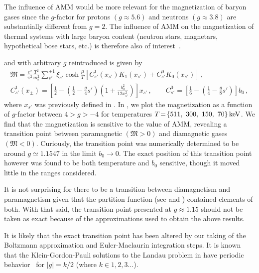 The influence of AMM would be more relevant for the magnetization of baryon gases since the $g$-factor for protons $(g\approx5.6)$ and neutrons $(g\approx3.8)$ are substantially different from $g\!=\!2$. The influence of AMM on the magnetization of thermal systems with large baryon content (neutron stars, magnetars, hypothetical bose stars, etc.) is therefore also of interest~\cite{Ferrer:2019xlr,Ferrer:2023pgq}.

 and  with arbitrary $g$ reintroduced is given by
\begin{gather}
\label{arbg:1}
{\mathfrak M}=\frac{e^{2}}{\pi^{2}}\frac{T^{2}}{m_{e}^{2}}\sum_{s'}^{\pm1}\xi_{s'}\cosh{\frac{\mu}{T}}
\left[C^{1}_{s'}(x_{s'})K_{1}(x_{s'})+C^{0}_{s'}K_{0}(x_{s'})\right]\,,\\
\label{arbg:2}
C^{1}_{s'}(x_{\pm}) = \left[\frac{1}{2}-\left(\frac{1}{2}-\frac{g}{4}s'\right)\left(1+\frac{b^2_0}{12x^{2}_{s'}}\right)\right]x_{s'}\,,\qquad
C^{0}_{s'} = \left[\frac{1}{6}-\left(\frac{1}{4}-\frac{g}{8}s'\right)\right]b_0\,,
\end{gather}
where $x_{s'}$ was previously defined in . In , we plot the magnetization as a function of $g$-factor between $4>g>-4$ for temperatures $T\!=\!\{511,\ 300,\ 150,\ 70\}\keV$. We find that the magnetization is sensitive to the value of AMM, revealing a transition point between paramagnetic $({\mathfrak M}>0)$ and diamagnetic gases $({\mathfrak M}<0)$. Curiously, the transition point was numerically determined to be around $g\simeq1.1547$ in the limit $b_{0}\rightarrow0$. The exact position of this transition point however was found to be both temperature and $b_{0}$ sensitive, though it moved little in the ranges considered.

It is not surprising for there to be a transition between diamagnetism and paramagnetism given that the partition function (see  and ) contained elements of both. With that said, the transition point presented at $g\approx1.15$ should not be taken as exact because of the approximations used to obtain the above results. 

It is likely that the exact transition point has been altered by our taking of the Boltzmann approximation and Euler-Maclaurin integration steps. It is known that the Klein-Gordon-Pauli solutions to the Landau problem in  have periodic behavior~\cite{Steinmetz:2018ryf,Evans:2022fsu,Rafelski:2022bsv} for $|g|=k/2$ (where $k\in1,2,3\ldots$).

